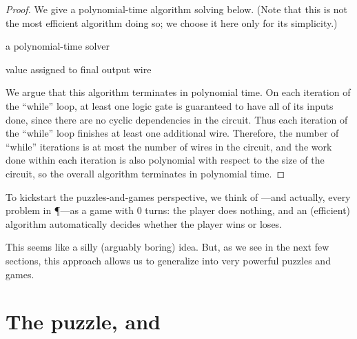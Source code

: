 \begin{proof}
  We give a polynomial-time algorithm solving  below.
  (Note that this is not the most efficient algorithm doing so; we choose it
  here only for its simplicity.)

  \begin{algorithm}{a polynomial-time \CircVal{} solver}{}
    \begin{algorithmic}
      \EndIf%
      \EndFor%
      \EndWhile%
      \State \Return value assigned to final output wire%
    \end{algorithmic}
  \end{algorithm}

  We argue that this algorithm terminates in polynomial time.  On each
  iteration of the ``while'' loop, at least one logic gate is guaranteed to
  have all of its inputs done, since there are no cyclic dependencies in the
  circuit.  Thus each iteration of the ``while'' loop finishes at least one
  additional wire.  Therefore, the number of ``while'' iterations is at most
  the number of wires in the circuit, and the work done within each iteration
  is also polynomial with respect to the size of the circuit, so the overall
  algorithm terminates in polynomial time.
\end{proof}

To kickstart the puzzles-and-games perspective, we think of ---and actually, every problem in \P---as a game with \(0\) turns: the
player does nothing, and an (efficient) algorithm automatically decides whether
the player wins or loses.

This seems like a silly (arguably boring) idea.  But, as we see in the next few
sections, this approach allows us to generalize  into
very powerful puzzles and games.

\section{The  puzzle, and \NP}

